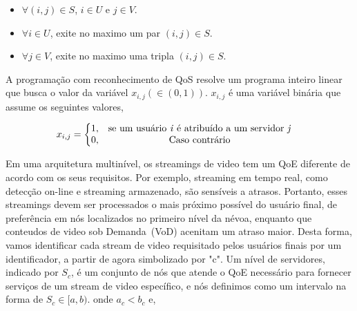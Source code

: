 \begin{itemize}
\item $\forall (i,j) \in S$, $i \in U$ e $j \in V$.

\item $\forall i \in U$, exite no maximo um par $(i,j) \in S$.

\item $\forall j \in V$, exite no maximo uma tripla $(i,j) \in S$.
\end{itemize}
 

%
%
%


A programação com reconhecimento de QoS resolve um programa inteiro linear que busca o valor da variável $x_{i,j} (\in (0, 1))$. $x_{i,j}$ é uma variável binária que assume os seguintes valores,

\vspace{0.5cm}
\begin{equation}\label{total_capacity_loss}
x_{i,j} =
\left\{\begin{matrix}
1, & \text{se um usuário \textit{i} é atribuído a um servidor \textit{j}} & \\ 
0, & \text{Caso contrário} & 
\end{matrix}\right.
\end{equation}
\vspace{0.5cm}

Em uma arquitetura multinível, os streamings de video tem um QoE diferente de acordo com os seus requisitos. Por exemplo, streaming em tempo real, como detecção on-line e streaming armazenado, são sensíveis a atrasos. Portanto, esses streamings devem ser processados o mais próximo possível do usuário final, de preferência em nós localizados no primeiro nível da névoa, enquanto que conteudos de video sob Demanda~(VoD) acenitam um atraso maior. Desta forma, vamos identificar cada stream de video requisitado pelos usuários finais por um identificador, a partir de agora simbolizado por "c".
Um nível de servidores, indicado por $S_{c}$, é um conjunto de nós que atende o QoE necessário para fornecer serviços de um stream de video específico, e nós definimos como um intervalo na forma de $S_{c} \in [a, b)$. onde $a_{c} < b_{c}$ e,

